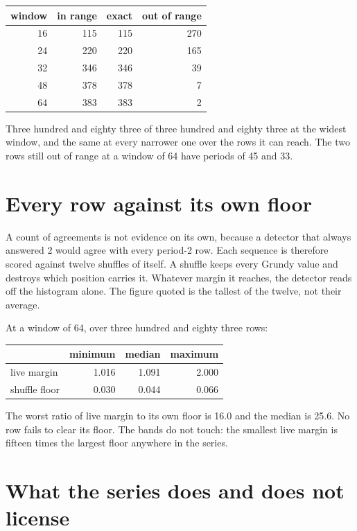 \begin{center}
\begin{tabular}{@{}rrrr@{}}
\toprule
window & in range & exact & out of range \\
\midrule
16 & 115 & 115 & 270 \\
24 & 220 & 220 & 165 \\
32 & 346 & 346 & 39 \\
48 & 378 & 378 & 7 \\
64 & 383 & 383 & 2 \\
\bottomrule
\end{tabular}
\end{center}

Three hundred and eighty three of three hundred and eighty three at the widest window, and the same
at every narrower one over the rows it can reach. The two rows still out of range at a window of 64
have periods of 45 and 33.

\section{Every row against its own floor}

A count of agreements is not evidence on its own, because a detector that always answered 2 would
agree with every period-2 row. Each sequence is therefore scored against twelve shuffles of itself.
A shuffle keeps every Grundy value and destroys which position carries it. Whatever margin it
reaches, the detector reads off the histogram alone. The figure quoted is the tallest of the
twelve, not their average.

At a window of 64, over three hundred and eighty three rows:

\begin{center}
\begin{tabular}{@{}lrrr@{}}
\toprule
 & minimum & median & maximum \\
\midrule
live margin & 1.016 & 1.091 & 2.000 \\
shuffle floor & 0.030 & 0.044 & 0.066 \\
\bottomrule
\end{tabular}
\end{center}

The worst ratio of live margin to its own floor is 16.0 and the median is 25.6. No row fails to
clear its floor. The bands do not touch: the smallest live margin is fifteen times the largest
floor anywhere in the series.

\section{What the series does and does not license}

